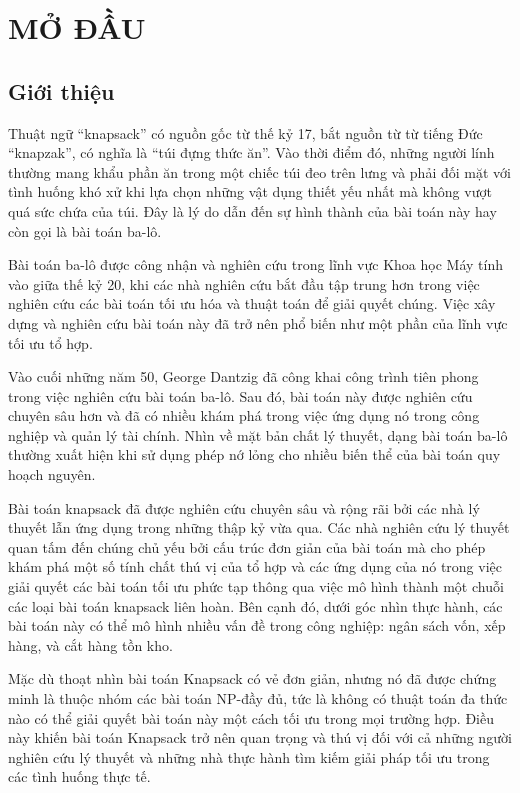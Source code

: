 \chapter{MỞ ĐẦU}


\section{Giới thiệu}
Thuật ngữ ``knapsack'' có nguồn gốc từ thế kỷ 17, bắt nguồn từ từ tiếng Đức ``knapzak'', có nghĩa là ``túi đựng thức ăn''. Vào thời điểm đó, những người lính thường mang khẩu phần ăn trong một chiếc túi đeo trên lưng và phải đối mặt với tình huống khó xử khi lựa chọn những vật dụng thiết yếu nhất mà không vượt quá sức chứa của túi. Đây là lý do dẫn đến sự hình thành của bài toán này hay còn gọi là bài toán ba-lô.

Bài toán ba-lô được công nhận và nghiên cứu trong lĩnh vực Khoa học Máy tính vào giữa thế kỷ 20, khi các nhà nghiên cứu bắt đầu tập trung hơn trong việc nghiên cứu các bài toán tối ưu hóa và thuật toán để giải quyết chúng. Việc xây dựng và nghiên cứu bài toán này đã trở nên phổ biến như một phần của lĩnh vực tối ưu tổ hợp.

Vào cuối những năm 50, George Dantzig đã công khai công trình tiên phong trong việc nghiên cứu bài toán ba-lô. Sau đó, bài toán này được nghiên cứu chuyên sâu hơn và đã có nhiều khám phá trong việc ứng dụng nó trong công nghiệp và quản lý tài chính. Nhìn về mặt bản chất lý thuyết, dạng bài toán ba-lô thường xuất hiện khi sử dụng phép nớ lỏng cho nhiều biến thể của bài toán quy hoạch nguyên. 

Bài toán knapsack đã được nghiên cứu chuyên sâu và rộng rãi bởi các nhà lý thuyết lẫn ứng dụng trong những thập kỷ vừa qua. Các nhà nghiên cứu lý thuyết quan tấm đến chúng chủ yếu bởi cấu trúc đơn giản của bài toán mà cho phép khám phá một số tính chất thú vị của tổ hợp và các ứng dụng của nó trong việc giải quyết các bài toán tối ưu phức tạp thông qua việc mô hình thành một chuỗi các loại bài toán knapsack liên hoàn. Bên cạnh đó, dưới góc nhìn thực hành, các bài toán này có thể mô hình nhiều vấn đề trong công nghiệp: ngân sách vốn, xếp hàng, và cắt hàng tồn kho.

Mặc dù thoạt nhìn bài toán Knapsack có vẻ đơn giản, nhưng nó đã được chứng minh là thuộc nhóm các bài toán NP-đầy đủ, tức là không có thuật toán đa thức nào có thể giải quyết bài toán này một cách tối ưu trong mọi trường hợp. Điều này khiến bài toán Knapsack trở nên quan trọng và thú vị đối với cả những người nghiên cứu lý thuyết và những nhà thực hành tìm kiếm giải pháp tối ưu trong các tình huống thực tế.

